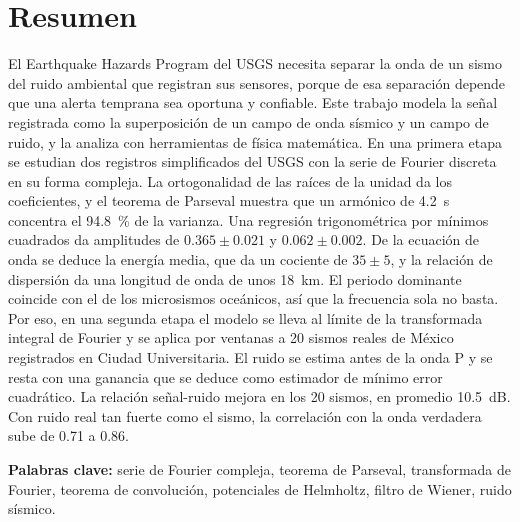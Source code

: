 \documentclass[11pt,letterpaper]{article}
\begin{document}
\section*{Resumen}
El Earthquake Hazards Program del USGS necesita separar la onda de un sismo del ruido ambiental que registran sus sensores, porque de esa separación depende que una alerta temprana sea oportuna y confiable. Este trabajo modela la señal registrada como la superposición de un campo de onda sísmico y un campo de ruido, y la analiza con herramientas de física matemática. En una primera etapa se estudian dos registros simplificados del USGS con la serie de Fourier discreta en su forma compleja. La ortogonalidad de las raíces de la unidad da los coeficientes, y el teorema de Parseval muestra que un armónico de \SI{4.2}{s} concentra el \SI{94.8}{\percent} de la varianza. Una regresión trigonométrica por mínimos cuadrados da amplitudes de $0.365 \pm 0.021$ y $0.062 \pm 0.002$. De la ecuación de onda se deduce la energía media, que da un cociente de $35 \pm 5$, y la relación de dispersión da una longitud de onda de unos \SI{18}{km}. El periodo dominante coincide con el de los microsismos oceánicos, así que la frecuencia sola no basta. Por eso, en una segunda etapa el modelo se lleva al límite de la transformada integral de Fourier y se aplica por ventanas a 20 sismos reales de México registrados en Ciudad Universitaria. El ruido se estima antes de la onda P y se resta con una ganancia que se deduce como estimador de mínimo error cuadrático. La relación señal-ruido mejora en los 20 sismos, en promedio \SI{10.5}{dB}. Con ruido real tan fuerte como el sismo, la correlación con la onda verdadera sube de 0.71 a 0.86.

\textbf{Palabras clave:} serie de Fourier compleja, teorema de Parseval, transformada de Fourier, teorema de convolución, potenciales de Helmholtz, filtro de Wiener, ruido sísmico.
\end{document}
